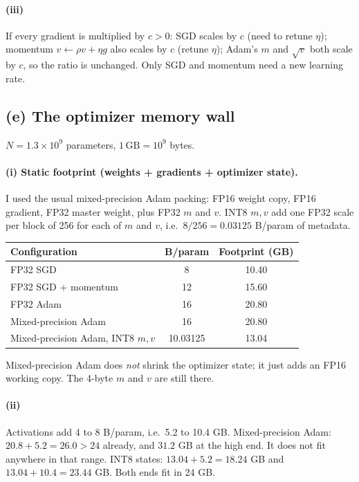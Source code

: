 \documentclass[11pt]{article}
\begin{document}
\paragraph{(iii)}
If every gradient is multiplied by \(c>0\):
SGD scales by \(c\) (need to retune \(\eta\));
momentum \(v\leftarrow\rho v+\eta g\) also scales by \(c\) (retune
\(\eta\));
Adam's \(m\) and \(\sqrt{v}\) both scale by \(c\), so the ratio is
unchanged. Only SGD and momentum need a new learning rate.

\subsection*{(e) The optimizer memory wall}

\(N=1.3\times 10^9\) parameters, \(1\,\mathrm{GB}=10^9\) bytes.

\paragraph{(i) Static footprint (weights + gradients + optimizer state).}
I used the usual mixed-precision Adam packing: FP16 weight copy,
FP16 gradient, FP32 master weight, plus FP32 \(m\) and \(v\).
INT8 \(m,v\) add one FP32 scale per block of 256 for each of \(m\) and
\(v\), i.e.\ \(8/256=0.03125\) B/param of metadata.
\begin{center}
\begin{tabular}{lcc}
\toprule
Configuration & B/param & Footprint (GB) \\
\midrule
FP32 SGD & 8 & 10.40 \\
FP32 SGD + momentum & 12 & 15.60 \\
FP32 Adam & 16 & 20.80 \\
Mixed-precision Adam & 16 & 20.80 \\
Mixed-precision Adam, INT8 \(m,v\) & 10.03125 & 13.04 \\
\bottomrule
\end{tabular}
\end{center}
Mixed-precision Adam does \emph{not} shrink the optimizer state; it
just adds an FP16 working copy. The 4-byte \(m\) and \(v\) are still
there.

\paragraph{(ii)}
Activations add 4 to 8 B/param, i.e.\ 5.2 to 10.4 GB.
Mixed-precision Adam: \(20.8+5.2=26.0>24\) already, and
\(31.2\) GB at the high end. It does not fit anywhere in that range.
INT8 states: \(13.04+5.2=18.24\) GB and \(13.04+10.4=23.44\) GB. Both
ends fit in 24 GB.
\end{document}

